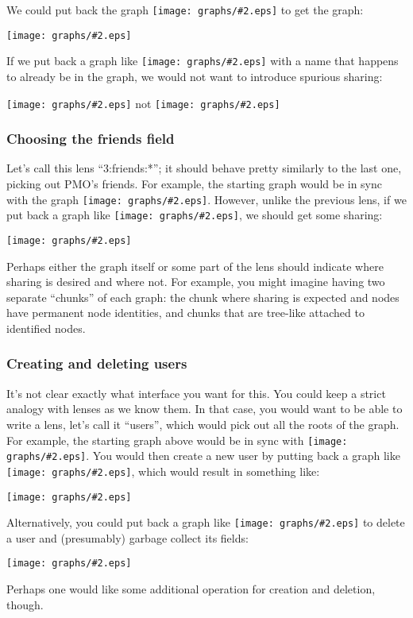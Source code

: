 \documentclass{article}
\newcommand{\scaledgraph}[2]{\texttt{[image: graphs/\#2.eps]}}
\newcommand{\graph}[1]{\scaledgraph{0.5}{#1}}
\newcommand{\centeredgraph}[1]{\begin{center}\graph{#1}\end{center}}
\newcommand{\inlinegraph}[1]{\scaledgraph{0.2}{#1}}
\begin{document}
We could put back the graph \inlinegraph{facebook-name-dmw} to get the
graph:

\centeredgraph{facebook-start-dmw}

If we put back a graph like \inlinegraph{facebook-name-jp} with a name that
happens to already be in the graph, we would not want to introduce spurious
sharing:

\begin{center}
    \graph{facebook-start-jp} not \graph{facebook-spurious-sharing}
\end{center}

\subsubsection*{Choosing the friends field}

Let's call this lens ``3:friends:*''; it should behave pretty similarly to the
last one, picking out PMO's friends. For example, the starting graph would
be in sync with the graph \inlinegraph{facebook-friends}. However, unlike
the previous lens, if we put back a graph like
\inlinegraph{facebook-friends-1}, we should get some sharing:

\centeredgraph{facebook-start-more-friends}

Perhaps either the graph itself or some part of the lens should indicate
where sharing is desired and where not. For example, you might imagine
having two separate ``chunks'' of each graph: the chunk where sharing is
expected and nodes have permanent node identities, and chunks that are
tree-like attached to identified nodes.

\subsubsection*{Creating and deleting users}

It's not clear exactly what interface you want for this. You could keep a
strict analogy with lenses as we know them. In that case, you would want to
be able to write a lens, let's call it ``users'', which would pick out all
the roots of the graph. For example, the starting graph above would be in
sync with \inlinegraph{facebook-roots}. You would then create a new user by
putting back a graph like \inlinegraph{facebook-more-roots}, which would
result in something like:
\centeredgraph{facebook-start-more-roots}
Alternatively, you could put back a graph like
\inlinegraph{facebook-fewer-roots} to delete a user and (presumably) garbage
collect its fields:
\centeredgraph{facebook-start-fewer-roots}
Perhaps one would like some additional operation for creation and deletion,
though.
\end{document}
